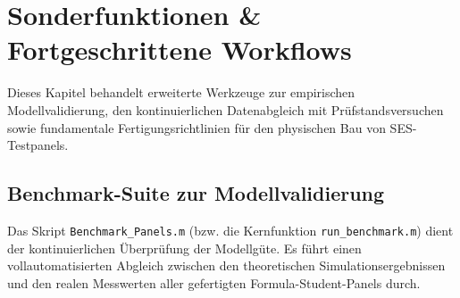 \chapter{Sonderfunktionen \& Fortgeschrittene Workflows} \label{ch:advanced}

Dieses Kapitel behandelt erweiterte Werkzeuge zur empirischen Modellvalidierung, den kontinuierlichen Datenabgleich mit Prüfstandsversuchen sowie fundamentale Fertigungsrichtlinien für den physischen Bau von SES-Testpanels.

\section{Benchmark-Suite zur Modellvalidierung} \label{sec:benchmark}

Das Skript \texttt{Benchmark\_Panels.m} (bzw. die Kernfunktion \texttt{run\_benchmark.m}) dient der kontinuierlichen Überprüfung der Modellgüte. Es führt einen vollautomatisierten Abgleich zwischen den theoretischen Simulationsergebnissen und den realen Messwerten aller gefertigten Formula-Student-Panels durch.

